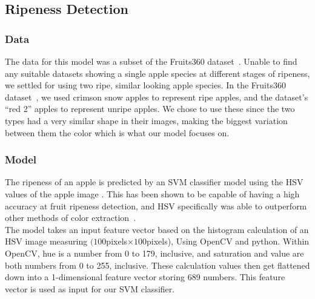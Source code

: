 \subsection{Ripeness Detection}
\subsubsection{Data}
The data for this model was a subset of the Fruits360 dataset~\cite{Fruit360}.
Unable to find any suitable datasets showing a single apple species at different stages of ripeness, we settled for using two ripe, similar looking apple species.
In the Fruits360 dataset~\cite{Fruit360}, we used crimson snow apples to represent ripe apples, and the dataset's ``red 2'' apples to represent unripe apples. We  chose to use these since the two types had a very similar shape in their images, making the biggest variation between them the color which is what our model focuses on.

\subsubsection{Model}
The ripeness of an apple is predicted by an SVM classifier model using the HSV values of the apple image . This has been shown to be capable of having a high accuracy at fruit ripeness detection, and HSV specifically was able to outperform other methods of color extraction~\cite{HSVRipeness}.\\
The model takes an input feature vector based on the histogram calculation of an HSV image measuring $(100$pixels$\times100$pixels), Using OpenCV and python.
Within OpenCV, hue is a number from 0 to 179, inclusive, and saturation and value are both numbers from 0 to 255, inclusive.
These calculation values then get flattened down into a 1-dimensional feature vector storing 689 numbers. 
This feature vector is used as input for our SVM classifier.\\


